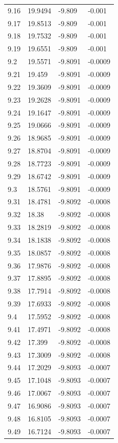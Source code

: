 \begin{tabular}{llll}
9.16 & 19.9494 & -9.809 & -0.001 \\
9.17 & 19.8513 & -9.809 & -0.001 \\
9.18 & 19.7532 & -9.809 & -0.001 \\
9.19 & 19.6551 & -9.809 & -0.001 \\
9.2 & 19.5571 & -9.8091 & -0.0009 \\
9.21 & 19.459 & -9.8091 & -0.0009 \\
9.22 & 19.3609 & -9.8091 & -0.0009 \\
9.23 & 19.2628 & -9.8091 & -0.0009 \\
9.24 & 19.1647 & -9.8091 & -0.0009 \\
9.25 & 19.0666 & -9.8091 & -0.0009 \\
9.26 & 18.9685 & -9.8091 & -0.0009 \\
9.27 & 18.8704 & -9.8091 & -0.0009 \\
9.28 & 18.7723 & -9.8091 & -0.0009 \\
9.29 & 18.6742 & -9.8091 & -0.0009 \\
9.3 & 18.5761 & -9.8091 & -0.0009 \\
9.31 & 18.4781 & -9.8092 & -0.0008 \\
9.32 & 18.38 & -9.8092 & -0.0008 \\
9.33 & 18.2819 & -9.8092 & -0.0008 \\
9.34 & 18.1838 & -9.8092 & -0.0008 \\
9.35 & 18.0857 & -9.8092 & -0.0008 \\
9.36 & 17.9876 & -9.8092 & -0.0008 \\
9.37 & 17.8895 & -9.8092 & -0.0008 \\
9.38 & 17.7914 & -9.8092 & -0.0008 \\
9.39 & 17.6933 & -9.8092 & -0.0008 \\
9.4 & 17.5952 & -9.8092 & -0.0008 \\
9.41 & 17.4971 & -9.8092 & -0.0008 \\
9.42 & 17.399 & -9.8092 & -0.0008 \\
9.43 & 17.3009 & -9.8092 & -0.0008 \\
9.44 & 17.2029 & -9.8093 & -0.0007 \\
9.45 & 17.1048 & -9.8093 & -0.0007 \\
9.46 & 17.0067 & -9.8093 & -0.0007 \\
9.47 & 16.9086 & -9.8093 & -0.0007 \\
9.48 & 16.8105 & -9.8093 & -0.0007 \\
9.49 & 16.7124 & -9.8093 & -0.0007 \\

\end{tabular}
